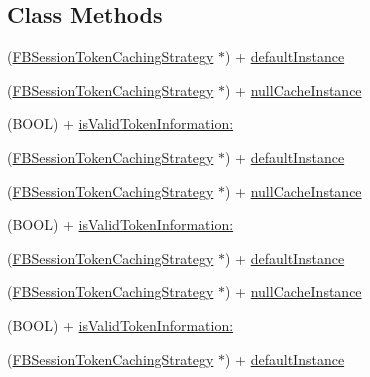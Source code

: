 \subsection*{Class Methods}
\begin{DoxyCompactItemize}
\item 
(\hyperlink{interfaceFBSessionTokenCachingStrategy}{F\+B\+Session\+Token\+Caching\+Strategy} $\ast$) + \hyperlink{interfaceFBSessionTokenCachingStrategy_a293d422412b33d069fef99f651b74b87}{default\+Instance}
\item 
(\hyperlink{interfaceFBSessionTokenCachingStrategy}{F\+B\+Session\+Token\+Caching\+Strategy} $\ast$) + \hyperlink{interfaceFBSessionTokenCachingStrategy_a97f1da9c8423d4e6bbca2241bd894032}{null\+Cache\+Instance}
\item 
(B\+O\+OL) + \hyperlink{interfaceFBSessionTokenCachingStrategy_a3974571bceb0745f400bf2a6674a963f}{is\+Valid\+Token\+Information\+:}
\item 
(\hyperlink{interfaceFBSessionTokenCachingStrategy}{F\+B\+Session\+Token\+Caching\+Strategy} $\ast$) + \hyperlink{interfaceFBSessionTokenCachingStrategy_a293d422412b33d069fef99f651b74b87}{default\+Instance}
\item 
(\hyperlink{interfaceFBSessionTokenCachingStrategy}{F\+B\+Session\+Token\+Caching\+Strategy} $\ast$) + \hyperlink{interfaceFBSessionTokenCachingStrategy_a97f1da9c8423d4e6bbca2241bd894032}{null\+Cache\+Instance}
\item 
(B\+O\+OL) + \hyperlink{interfaceFBSessionTokenCachingStrategy_a3974571bceb0745f400bf2a6674a963f}{is\+Valid\+Token\+Information\+:}
\item 
(\hyperlink{interfaceFBSessionTokenCachingStrategy}{F\+B\+Session\+Token\+Caching\+Strategy} $\ast$) + \hyperlink{interfaceFBSessionTokenCachingStrategy_a293d422412b33d069fef99f651b74b87}{default\+Instance}
\item 
(\hyperlink{interfaceFBSessionTokenCachingStrategy}{F\+B\+Session\+Token\+Caching\+Strategy} $\ast$) + \hyperlink{interfaceFBSessionTokenCachingStrategy_a97f1da9c8423d4e6bbca2241bd894032}{null\+Cache\+Instance}
\item 
(B\+O\+OL) + \hyperlink{interfaceFBSessionTokenCachingStrategy_a3974571bceb0745f400bf2a6674a963f}{is\+Valid\+Token\+Information\+:}
\item 
(\hyperlink{interfaceFBSessionTokenCachingStrategy}{F\+B\+Session\+Token\+Caching\+Strategy} $\ast$) + \hyperlink{interfaceFBSessionTokenCachingStrategy_a293d422412b33d069fef99f651b74b87}{default\+Instance}
\item 

\end{DoxyCompactItemize}
